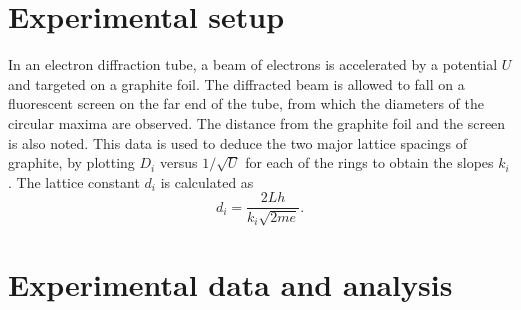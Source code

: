 \documentclass[11pt]{article}
\begin{document}
        \section{Experimental setup}
        In an electron diffraction tube, a beam of electrons is accelerated by a potential $U$ and targeted on a graphite foil.
        The diffracted beam is allowed to fall on a fluorescent screen on the far end of the tube, from which the diameters of the
        circular maxima are observed. The distance from the graphite foil and the screen is also noted.
        This data is used to deduce the two major lattice spacings of graphite, by plotting $D_i$ versus $1 /\sqrt{U}$
        for each of the rings to obtain the slopes $k_i$. The lattice constant $d_i$ is calculated as
        \[
                d_i = \frac{2Lh}{k_i\sqrt{2me}}.
        \]

        \section{Experimental data and analysis}
\end{document}
